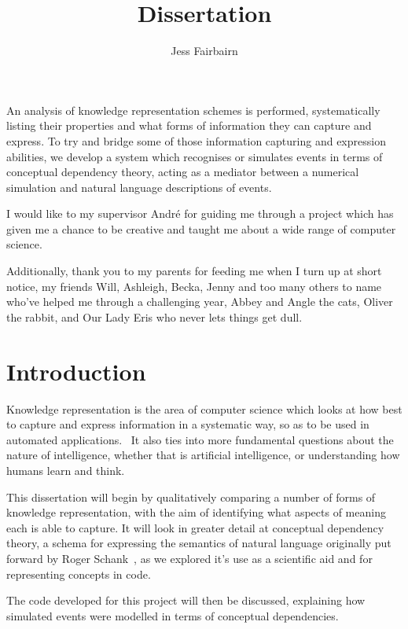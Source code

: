 \documentclass[12pt,MSc,wordcount,twoside]{muthesis}
\begin{document}
    \title{Dissertation}
    \author{Jess Fairbairn}
        
    \beforeabstract

    An analysis of knowledge representation schemes is performed, systematically listing their properties and what forms of information they can capture and express. To try and bridge some of those information capturing and expression abilities, we develop a system which recognises or simulates events in terms of conceptual dependency theory, acting as a mediator between a numerical simulation and natural language descriptions of events.
    
    \afterabstract
    
    I would like to my supervisor Andr{\'e} for guiding me through a project which has given me a chance to be creative and taught me about a wide range of computer science.

    Additionally, thank you to my parents for feeding me when I turn up at short notice, my friends Will, Ashleigh, Becka, Jenny and too many others to name who've helped me through a challenging year, Abbey and Angle the cats, Oliver the rabbit, and Our Lady Eris who never lets things get dull.
    \afterpreface
    

    \tableofcontents
    \section{Introduction}
    Knowledge representation is the area of computer science which looks at how best to capture and express information in a systematic way, so as to be used in automated applications.~\cite{brachman1992knowledge} It also ties into more fundamental questions about the nature of intelligence, whether that is artificial intelligence, or understanding how humans learn and think.

    This dissertation will begin by qualitatively comparing a number of forms of knowledge representation, with the aim of identifying what aspects of meaning each is able to capture. It will look in greater detail at conceptual dependency theory, a schema for expressing the semantics of natural language originally put forward by Roger Schank~\cite{SCHANK1972552}, as we explored it's use as a scientific aid and for representing concepts in code.

    The code developed for this project will then be discussed, explaining how simulated events were modelled in terms of conceptual dependencies. 
\end{document}

